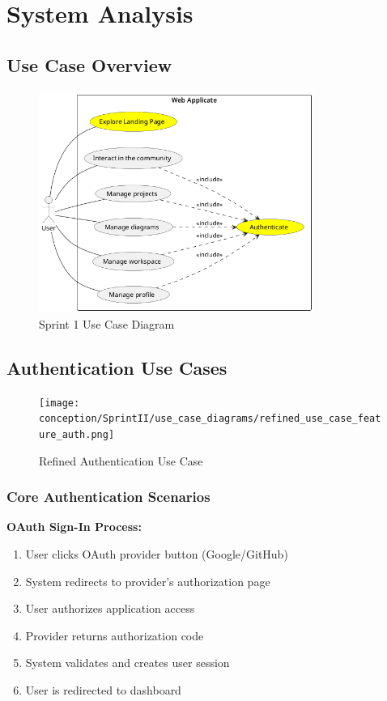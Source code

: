 \section{System Analysis}

\subsection{Use Case Overview}
\begin{figure}[H]
    \centering
    \includegraphics[width=0.8\textwidth]{conception/SprintII/use_case_diagrams/use_case_diagram_of_SprintII.png}
    \caption{Sprint 1 Use Case Diagram}
    \label{fig:usecase_sprint2}
\end{figure}
\newpage
\subsection{Authentication Use Cases}
\begin{figure}[H]
    \centering
    \texttt{[image: conception/SprintII/use\_case\_diagrams/refined\_use\_case\_feature\_auth.png]}
    \caption{Refined Authentication Use Case}
    \label{fig:refined_auth_usecase}
\end{figure}

\subsubsection{Core Authentication Scenarios}

\textbf{OAuth Sign-In Process:}
\begin{enumerate}
    \item User clicks OAuth provider button (Google/GitHub)
    \item System redirects to provider's authorization page
    \item User authorizes application access
    \item Provider returns authorization code
    \item System validates and creates user session
    \item User is redirected to dashboard
\end{enumerate}

